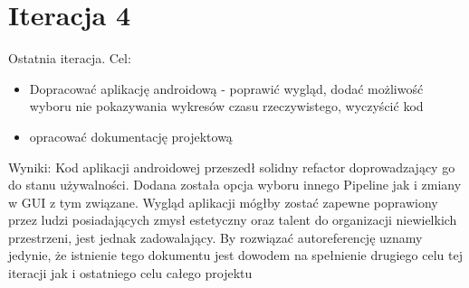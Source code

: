 \section{Iteracja 4}
\begin{Note}
Ostatnia iteracja. Cel:
\begin{itemize}
\item Dopracować aplikację androidową - poprawić wygląd, dodać możliwość wyboru nie pokazywania wykresów czasu rzeczywistego, wyczyścić kod
\item opracować dokumentację projektową
\end{itemize}

Wyniki:
Kod aplikacji androidowej przeszedł solidny refactor doprowadzający go do stanu używalności. Dodana została opcja wyboru innego Pipeline jak i zmiany w GUI z tym związane. Wygląd aplikacji mógłby zostać zapewne poprawiony przez ludzi posiadających zmysł estetyczny oraz talent do organizacji niewielkich przestrzeni, jest jednak zadowalający.
By rozwiązać autoreferencję uznamy jedynie, że istnienie tego dokumentu jest dowodem na spełnienie drugiego celu tej iteracji jak i ostatniego celu całego projektu
\end{Note}
